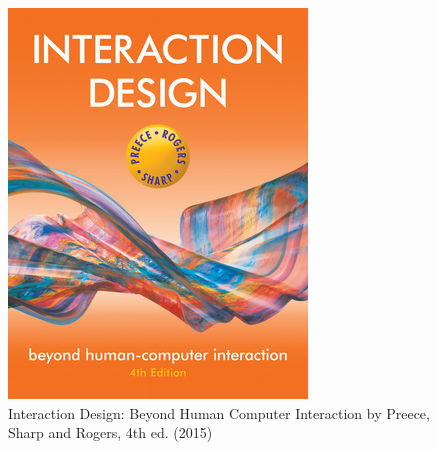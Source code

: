 \documentclass{beamer}
\begin{document}
\begin{frame}
\begin{columns}[t]
		\begin{figure}
			\includegraphics[width=0.9\linewidth]{rogers}
			\caption{Interaction Design: Beyond Human Computer Interaction by Preece, Sharp and Rogers, 4th ed. (2015)}
		\end{figure}
	
	\end{columns}
	
\end{frame}
\end{document}
